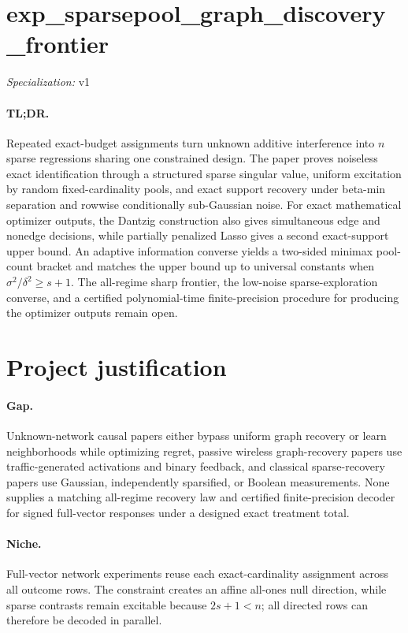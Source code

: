 \documentclass{article}
\begin{document}
\sloppy

\section*{exp\_\allowbreak{}sparsepool\_\allowbreak{}graph\_\allowbreak{}discovery\_\allowbreak{}frontier}

\noindent\textit{Specialization:} v1\par

\paragraph{TL;DR.} Repeated exact-budget assignments turn unknown additive interference into \(n\) sparse regressions sharing one constrained design. The paper proves noiseless exact identification through a structured sparse singular value, uniform excitation by random fixed-cardinality pools, and exact support recovery under beta-min separation and rowwise conditionally sub-Gaussian noise. For exact mathematical optimizer outputs, the Dantzig construction also gives simultaneous edge and nonedge decisions, while partially penalized Lasso gives a second exact-support upper bound. An adaptive information converse yields a two-sided minimax pool-count bracket and matches the upper bound up to universal constants when \(\sigma^2/\delta^2\ge s+1\). The all-regime sharp frontier, the low-noise sparse-exploration converse, and a certified polynomial-time finite-precision procedure for producing the optimizer outputs remain open.

\section{Project justification}

\paragraph{Gap.} Unknown-network causal papers either bypass uniform graph recovery or learn neighborhoods while optimizing regret, passive wireless graph-recovery papers use traffic-generated activations and binary feedback, and classical sparse-recovery papers use Gaussian, independently sparsified, or Boolean measurements. None supplies a matching all-regime recovery law and certified finite-precision decoder for signed full-vector responses under a designed exact treatment total.

\paragraph{Niche.} Full-vector network experiments reuse each exact-cardinality assignment across all outcome rows. The constraint creates an affine all-ones null direction, while sparse contrasts remain excitable because \(2s+1<n\); all directed rows can therefore be decoded in parallel.
\end{document}
